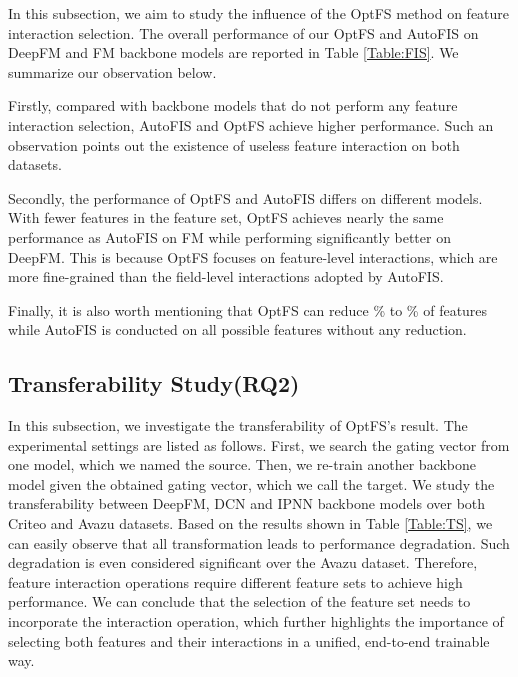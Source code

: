 \documentclass[sigconf]{acmart}
\begin{document}
In this subsection, we aim to study the influence of the OptFS method on feature interaction selection. The overall performance of our OptFS and AutoFIS on DeepFM and FM backbone models are reported in Table \ref{Table:FIS}. We summarize our observation below.

Firstly, compared with backbone models that do not perform any feature interaction selection, AutoFIS and OptFS achieve higher performance. Such an observation points out the existence of useless feature interaction on both datasets. 

Secondly, the performance of OptFS and AutoFIS differs on different models. With fewer features in the feature set, OptFS achieves nearly the same performance as AutoFIS on FM while performing significantly better on DeepFM. This is because OptFS focuses on feature-level interactions, which are more fine-grained than the field-level interactions adopted by AutoFIS.

Finally, it is also worth mentioning that OptFS can reduce \% to \% of features while AutoFIS is conducted on all possible features without any reduction.

\subsection{Transferability Study(RQ2)}

In this subsection, we investigate the transferability of OptFS's result. The experimental settings are listed as follows. First, we search the gating vector  from one model, which we named the source. Then, we re-train another backbone model given the obtained gating vector, which we call the target. We study the transferability between DeepFM, DCN and IPNN backbone models over both Criteo and Avazu datasets. Based on the results shown in Table \ref{Table:TS}, we can easily observe that all transformation leads to performance degradation. Such degradation is even considered significant over the Avazu dataset. Therefore, feature interaction operations require different feature sets to achieve high performance. We can conclude that the selection of the feature set needs to incorporate the interaction operation, which further highlights the importance of selecting both features and their interactions in a unified, end-to-end trainable way.
\end{document}
